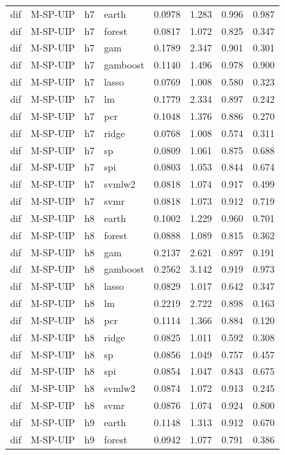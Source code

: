 \begin{ThreePartTable}
\begin{longtable}[t]{llclcccc}
dif & M-SP-UIP & h7 & earth & 0.0978 & 1.283 & 0.996 & 0.987\\
dif & M-SP-UIP & h7 & forest & 0.0817 & 1.072 & 0.825 & 0.347\\
dif & M-SP-UIP & h7 & gam & 0.1789 & 2.347 & 0.901 & 0.301\\
dif & M-SP-UIP & h7 & gamboost & 0.1140 & 1.496 & 0.978 & 0.900\\
dif & M-SP-UIP & h7 & lasso & 0.0769 & 1.008 & 0.580 & 0.323\\
dif & M-SP-UIP & h7 & lm & 0.1779 & 2.334 & 0.897 & 0.242\\
dif & M-SP-UIP & h7 & pcr & 0.1048 & 1.376 & 0.886 & 0.270\\
dif & M-SP-UIP & h7 & ridge & 0.0768 & 1.008 & 0.574 & 0.311\\
dif & M-SP-UIP & h7 & sp & 0.0809 & 1.061 & 0.875 & 0.688\\
dif & M-SP-UIP & h7 & spi & 0.0803 & 1.053 & 0.844 & 0.674\\
dif & M-SP-UIP & h7 & svmlw2 & 0.0818 & 1.074 & 0.917 & 0.499\\
dif & M-SP-UIP & h7 & svmr & 0.0818 & 1.073 & 0.912 & 0.719\\
\addlinespace
dif & M-SP-UIP & h8 & earth & 0.1002 & 1.229 & 0.960 & 0.701\\
dif & M-SP-UIP & h8 & forest & 0.0888 & 1.089 & 0.815 & 0.362\\
dif & M-SP-UIP & h8 & gam & 0.2137 & 2.621 & 0.897 & 0.191\\
dif & M-SP-UIP & h8 & gamboost & 0.2562 & 3.142 & 0.919 & 0.973\\
dif & M-SP-UIP & h8 & lasso & 0.0829 & 1.017 & 0.642 & 0.347\\
dif & M-SP-UIP & h8 & lm & 0.2219 & 2.722 & 0.898 & 0.163\\
dif & M-SP-UIP & h8 & pcr & 0.1114 & 1.366 & 0.884 & 0.120\\
dif & M-SP-UIP & h8 & ridge & 0.0825 & 1.011 & 0.592 & 0.308\\
dif & M-SP-UIP & h8 & sp & 0.0856 & 1.049 & 0.757 & 0.457\\
dif & M-SP-UIP & h8 & spi & 0.0854 & 1.047 & 0.843 & 0.675\\
dif & M-SP-UIP & h8 & svmlw2 & 0.0874 & 1.072 & 0.913 & 0.245\\
dif & M-SP-UIP & h8 & svmr & 0.0876 & 1.074 & 0.924 & 0.800\\
\addlinespace
dif & M-SP-UIP & h9 & earth & 0.1148 & 1.313 & 0.912 & 0.670\\
dif & M-SP-UIP & h9 & forest & 0.0942 & 1.077 & 0.791 & 0.386\\

\end{longtable}
\end{ThreePartTable}
